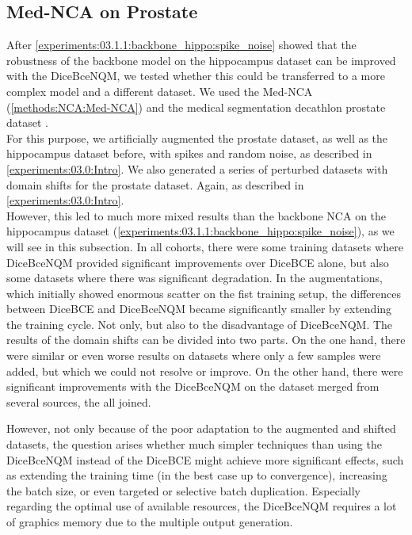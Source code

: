 \subsection{Med-NCA on Prostate}
\label{experiments:03.2.0:med_prost:intro}
After \autoref{experiments:03.1.1:backbone_hippo:spike_noise} showed that the robustness of the backbone model on the hippocampus dataset can be improved with the DiceBceNQM, we tested whether this could be transferred to a more complex model and a different dataset. We used the Med-NCA (\autoref{methods:NCA:Med-NCA}) and the medical segmentation decathlon prostate dataset \cite{Antonelli:2022:MedSegmentationDecatlon}.\\
For this purpose, we artificially augmented the prostate dataset, as well as the hippocampus dataset before, with spikes and random noise, as described in \autoref{experiments:03.0:Intro}. We also generated a series of perturbed datasets with domain shifts for the prostate dataset. Again, as described in \autoref{experiments:03.0:Intro}. \\
However, this led to much more mixed results than the backbone NCA on the hippocampus dataset (\autoref{experiments:03.1.1:backbone_hippo:spike_noise}), as we will see in this subsection.
In all cohorts, there were some training datasets where DiceBceNQM provided significant improvements over DiceBCE alone, but also some datasets where there was significant degradation. 
In the augmentations, which initially showed enormous scatter on the fist training setup, the differences between DiceBCE and DiceBceNQM became significantly smaller by extending the training cycle. Not only, but also to the disadvantage of DiceBceNQM. 
The results of the domain shifts can be divided into two parts. On the one hand, there were similar or even worse results on datasets where only a few samples were added, but which we could not resolve or improve.
On the other hand, there were significant improvements with the DiceBceNQM on the dataset merged from several sources, the all joined.

However, not only because of the poor adaptation to the augmented and shifted datasets, the question arises whether much simpler techniques than using the DiceBceNQM instead of the DiceBCE might achieve more significant effects, such as extending the training time (in the best case up to convergence), increasing the batch size, or even targeted or selective batch duplication. Especially regarding the optimal use of available resources, the DiceBceNQM requires a lot of graphics memory due to the multiple output generation.



